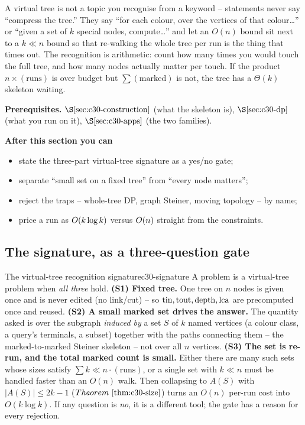 \begin{topicintro}
A virtual tree is not a topic you recognise from a keyword -- statements never say
``compress the tree.'' They say ``for each colour, over the vertices of that
colour\ldots'' or ``given a set of \(k\) special nodes, compute\ldots'' and let an
\(O(n)\) bound sit next to a \(k\ll n\) bound so that re-walking the whole tree per
run is the thing that times out.  The recognition is arithmetic: count how many
times you would touch the full tree, and how many nodes actually matter per touch.
If the product \(n\times(\text{runs})\) is over budget but \(\sum(\text{marked})\)
is not, the tree has a \(\Theta(k)\) skeleton waiting.

\textbf{Prerequisites.} \(\secref{c30-construction}\) (what the skeleton is),
\(\secref{c30-dp}\) (what you run on it), \(\secref{c30-apps}\) (the two families).

\textbf{After this section you can}
\begin{itemize}[nosep]
  \item state the three-part virtual-tree signature as a yes/no gate; \hfill{}
  \item separate ``small set on a fixed tree'' from ``every node matters''; \hfill{}
  \item reject the traps -- whole-tree DP, graph Steiner, moving topology -- by name; \hfill{}
  \item price a run as \(O(k\log k)\) versus \(O(n)\) straight from the constraints. \hfill{}
\end{itemize}
\end{topicintro}

\subsection{The signature, as a three-question gate}

\begin{definition}{The virtual-tree recognition signature}{c30-signature}
A problem is a virtual-tree problem when \emph{all three} hold. \textbf{(S1) Fixed
tree.} One tree on \(n\) nodes is given once and is never edited (no link/cut) -- so
\(\operatorname{tin},\operatorname{tout},\operatorname{depth},\operatorname{lca}\) are precomputed once and reused. \textbf{(S2) A small
marked set drives the answer.} The quantity asked is over the subgraph \emph{induced
by} a set \(S\) of \(k\) named vertices (a colour class, a query's terminals, a
subset) together with the paths connecting them -- the marked-to-marked Steiner
skeleton -- not over all \(n\) vertices. \textbf{(S3) The set is re-run, and the
total marked count is small.} Either there are many such sets whose sizes satisfy
\(\sum k \ll n\cdot(\text{runs})\), or a single set with \(k\ll n\) must be handled
faster than an \(O(n)\) walk. Then collapsing to \(A(S)\) with \(|A(S)|\le 2k-1\)
(\(\thmref{c30-size}\)) turns an \(O(n)\) per-run cost into \(O(k\log k)\).
If any question is \emph{no}, it is a different tool; the gate has a reason for
every rejection.
\end{definition}

